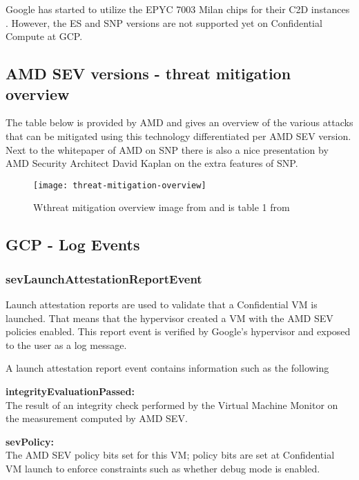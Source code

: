 Google has started to utilize the EPYC 7003 Milan chips 
for their C2D instances \citep{czop_introducing_2022}. 
However, the ES and SNP versions 
are not supported yet on Confidential Compute at GCP. 


\subsection*{AMD SEV versions - threat mitigation overview}
The table below is provided by AMD 
and gives an overview of the various attacks 
that can be mitigated using this technology differentiated per AMD SEV version. 
Next to the whitepaper of AMD on SNP \citep{amd_amd_2020}
there is also a nice presentation by AMD Security Architect 
David Kaplan \citep{kaplan_upcoming_2019} on the extra features of SNP. 

\begin{figure}[!ht]
    \centering
    \texttt{[image: threat-mitigation-overview]}
    \caption{Wthreat mitigation overview image 
     from \cite{larabel_amd_2022} and is table 1 from \cite{amd_amd_2020}}
    \label{fig:threat-mitigation-overview}
\end{figure}

 

\subsection*{GCP - Log Events}

\subsubsection*{sevLaunchAttestationReportEvent}
Launch attestation reports are used to validate 
that a Confidential VM is launched. 
That means that the hypervisor created a VM 
with the AMD SEV policies enabled. 
This report event is verified by Google’s hypervisor 
and exposed to the user as a log message.

A launch attestation report event contains information such as the following

\textbf{integrityEvaluationPassed: }\\
The result of an integrity check performed by the Virtual Machine Monitor 
on the measurement computed by AMD SEV.

\textbf{sevPolicy: }\\
The AMD SEV policy bits set for this VM; 
policy bits are set at Confidential VM launch to enforce constraints such as whether debug mode is enabled.


